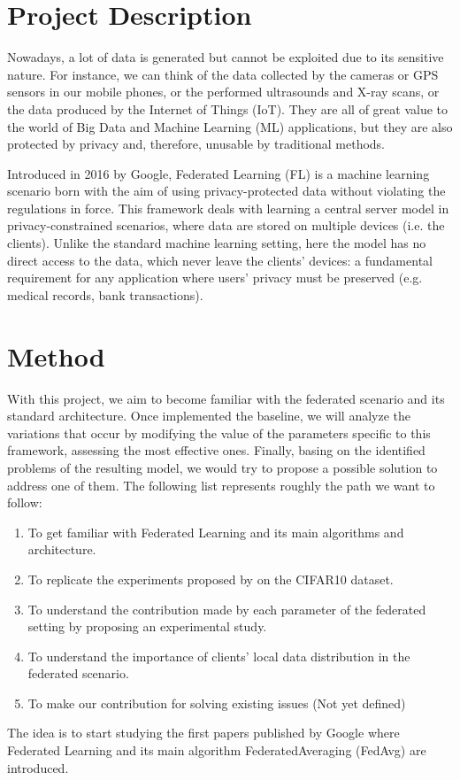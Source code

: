 \documentclass{article}
\begin{document}
	
	
\section{Project Description}

Nowadays, a lot of data is generated but cannot be exploited due to its sensitive nature. For
instance, we can think of the data collected by the cameras or GPS sensors in our mobile phones,
or the performed ultrasounds and X-ray scans, or the data produced by the Internet of Things
(IoT). They are all of great value to the world of Big Data and Machine Learning (ML) applications,
but they are also protected by privacy and, therefore, unusable by traditional methods.


Introduced in 2016 by Google, Federated Learning (FL) is a machine learning scenario born with
the aim of using privacy-protected data without violating the regulations in force. This framework
deals with learning a central server model in privacy-constrained scenarios, where data are
stored on multiple devices (i.e. the clients). Unlike the standard machine learning setting, here the
model has no direct access to the data, which never leave the clients’ devices: a fundamental
requirement for any application where users’ privacy must be preserved (e.g. medical records,
bank transactions).



\section{Method}
With this project, we aim to become familiar with the federated scenario and its standard architecture. Once implemented the baseline, we will analyze the variations that occur by modifying the value of the parameters specific to this framework, assessing the most effective ones. Finally, basing on the identified problems of the resulting model, we would try to propose a possible solution to address one of them. The following list represents roughly the path we want to follow:

\begin{enumerate}
    \item To get familiar with Federated Learning and its main algorithms and architecture.
    \item  To replicate the experiments proposed by \cite{DBLP:journals/corr/abs-2003-08082} on the CIFAR10 dataset.
    \item To understand the contribution made by each parameter of the federated setting by
proposing an experimental study.
\item To understand the importance of clients’ local data distribution in the federated scenario. 
\item To make our contribution for solving existing issues (Not yet defined)\\
\end{enumerate}
The idea is to start studying the first papers published by Google \cite{DBLP:journals/corr/McMahanMRA16}\cite{pmlr-v54-mcmahan17a}
where Federated Learning and its main algorithm FederatedAveraging (FedAvg) are introduced.
\end{document}
